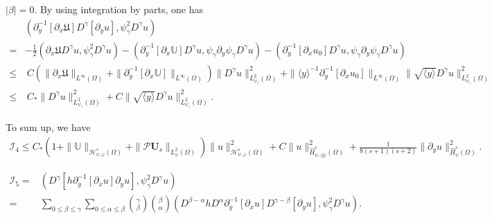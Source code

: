 \documentclass{amsart}
\numberwithin{equation}{section}
\newcommand\y{{{\langle y \rangle}}}
\begin{document}
 $|\beta|=0$. By using integration by parts, one has
\begin{align*}
&(\partial_{y}^{-1}[\partial_{x}\mathfrak{U}]D^{\gamma}[\partial_{y}u],\psi_{\gamma}^{2}D^{\gamma}u)\\
=&-\frac{1}{2}(\partial_{x}\mathfrak{U}D^{\gamma}u,\psi_{\gamma}^{2}D^{\gamma}u)
  -(\partial_{y}^{-1}[\partial_{x}\mathbb{U}]D^{\gamma}u,\psi_{\gamma}\partial_{y}\psi_{\gamma}D^{\gamma}u)
  -(\partial_{y}^{-1}[\partial_{x}u_{0}]D^{\gamma}u,\psi_{\gamma}\partial_{y}\psi_{\gamma}D^{\gamma}u)\\
\leq&~C\left(\|\partial_{x}\mathfrak{U}\|_{L^{\infty}(\Omega)}+\|\partial_{y}^{-1}[\partial_{x}\mathbb{U}]\|_{L^{\infty}(\Omega)}\right)
       \|D^{\gamma}u\|_{L_{\psi_{\gamma}}^{2}(\Omega)}^{2}
     +\|\y^{-1}\partial_{y}^{-1}[\partial_{x}u_{0}]\|_{L^{\infty}(\Omega)}
      \|\sqrt{\y}D^{\gamma}u\|_{L_{\psi_{\gamma}}^{2}(\Omega)}^{2}\\
\leq&~C_{*}\|D^{\gamma}u\|_{L_{\psi_{\gamma}}^{2}(\Omega)}^{2}
     +C\|\sqrt{\y}D^{\gamma}u\|_{L_{\psi_{\gamma}}^{2}(\Omega)}^{2}.
\end{align*}


To sum up, we have
\begin{align*}
\mathcal{I}_{4}
\leq C_{*}(1+\|\mathbb{U}\|_{\mathcal{H}_{\psi,\varphi}^{s}(\Omega)}+\|\mathcal{P}\mathbf{U}_{s}\|_{L_{\varphi}^{2}(\Omega)})
      \|u\|_{\mathcal{H}_{\psi,\varphi}^{s}(\Omega)}^{2}
    +C\|u\|_{\hat{H}_{\psi,\y}^{s}(\Omega)}^{2}
    +\frac{1}{8(s+1)(s+2)}\|\partial_{y}u\|_{\hat{H}_{\psi}^{s}(\Omega)}^{2}.
\end{align*}

\begin{align*}
\mathcal{I}_{5}
=& (D^{\gamma}[h\partial_{y}^{-1}[\partial_{x}u]\partial_{y}u],\psi_{\gamma}^{2} D^{\gamma}u)\\
=&\sum_{0\leq\beta\leq\gamma}\sum_{0\leq\alpha\leq\beta}\binom{\gamma}{\beta}\binom{\beta}{\alpha}
  (D^{\beta-\alpha}hD^{\alpha}\partial_{y}^{-1}[\partial_{x}u]D^{\gamma-\beta}[\partial_{y}u],\psi_{\gamma}^{2}D^{\gamma}u).
\end{align*}
\end{document}
